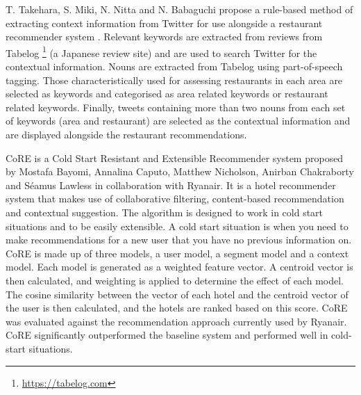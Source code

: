 T. Takehara, S. Miki, N. Nitta and N. Babaguchi propose a rule-based method of extracting context information from Twitter for use alongside a restaurant recommender system \cite{takeharaContext2012}. Relevant keywords are extracted from reviews from Tabelog \footnote{\url{https://tabelog.com}} (a Japanese review site) and are used to search Twitter for the contextual information. Nouns are extracted from Tabelog using part-of-speech tagging. Those characteristically used for assessing restaurants in each area are selected as keywords and categorised as area related keywords or restaurant related keywords. Finally, tweets containing more than two nouns from each set of keywords (area and restaurant) are selected as the contextual information and are displayed alongside the restaurant recommendations.

CoRE \cite{core2019} is a Cold Start Resistant and Extensible Recommender system proposed by Mostafa Bayomi, Annalina Caputo, Matthew Nicholson, Anirban Chakraborty and Séamus Lawless in collaboration with Ryanair. It is a hotel recommender system that makes use of collaborative filtering, content-based recommendation and contextual suggestion. The algorithm is designed to work in cold start situations and to be easily extensible. A cold start situation is when you need to make recommendations for a new user that you have no previous information on. CoRE is made up of three models, a user model, a segment model and a context model. Each model is generated as a weighted feature vector. A centroid vector is then calculated, and weighting is applied to determine the effect of each model. The cosine similarity between the vector of each hotel and the centroid vector of the user is then calculated, and the hotels are ranked based on this score. CoRE was evaluated against the recommendation approach currently used by Ryanair. CoRE significantly outperformed the baseline system and performed well in cold-start situations. 


